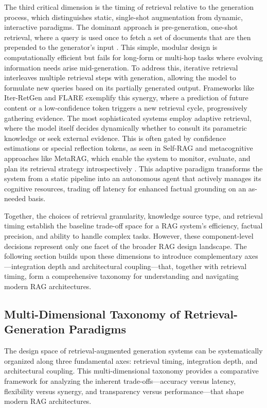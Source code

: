 \documentclass[11pt,a4paper]{article}
\begin{document}
The third critical dimension is the timing of retrieval relative to the generation process, which distinguishes static, single-shot augmentation from dynamic, interactive paradigms. The dominant approach is pre-generation, one-shot retrieval, where a query is used once to fetch a set of documents that are then prepended to the generator's input \cite{arxiv:2301.12652v4}. This simple, modular design is computationally efficient but fails for long-form or multi-hop tasks where evolving information needs arise mid-generation. To address this, iterative retrieval interleaves multiple retrieval steps with generation, allowing the model to formulate new queries based on its partially generated output. Frameworks like Iter-RetGen \cite{arxiv:2305.15294v2} and FLARE \cite{arxiv:2305.06983v2} exemplify this synergy, where a prediction of future content or a low-confidence token triggers a new retrieval cycle, progressively gathering evidence. The most sophisticated systems employ adaptive retrieval, where the model itself decides dynamically whether to consult its parametric knowledge or seek external evidence. This is often gated by confidence estimations or special reflection tokens, as seen in Self-RAG and metacognitive approaches like MetaRAG, which enable the system to monitor, evaluate, and plan its retrieval strategy introspectively \cite{arxiv:2402.11626v1}. This adaptive paradigm transforms the system from a static pipeline into an autonomous agent that actively manages its cognitive resources, trading off latency for enhanced factual grounding on an as-needed basis. 

Together, the choices of retrieval granularity, knowledge source type, and retrieval timing establish the baseline trade-off space for a RAG system's efficiency, factual precision, and ability to handle complex tasks. However, these component-level decisions represent only one facet of the broader RAG design landscape. The following section builds upon these dimensions to introduce complementary axes---integration depth and architectural coupling---that, together with retrieval timing, form a comprehensive taxonomy for understanding and navigating modern RAG architectures.


\subsection{Multi-Dimensional Taxonomy of Retrieval-Generation Paradigms}


The design space of retrieval-augmented generation systems can be systematically organized along three fundamental axes: retrieval timing, integration depth, and architectural coupling. This multi-dimensional taxonomy provides a comparative framework for analyzing the inherent trade-offs---accuracy versus latency, flexibility versus synergy, and transparency versus performance---that shape modern RAG architectures.
\end{document}

